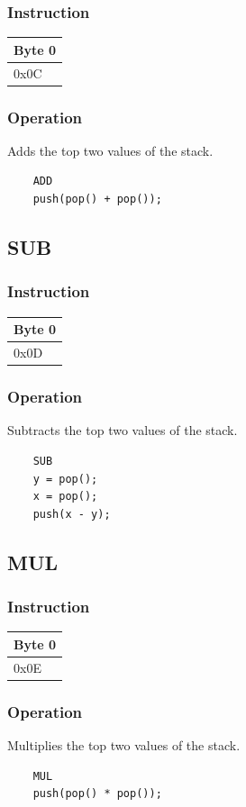 \documentclass[11pt]{report}
\newcommand{\onebyteinstruction}[1]{
\begin{tabular}{|p{3.9em}|}
\hline
\tiny{Byte 0} \\ \hline
#1  \\ \hline
\end{tabular}
}
\begin{document}
\subsubsection{Instruction}
\onebyteinstruction{0x0C}

\subsubsection{Operation}
Adds the top two values of the stack.

	\begin{lstlisting}
	ADD
	push(pop() + pop());
	\end{lstlisting}

\subsection{SUB}
\subsubsection{Instruction}
\onebyteinstruction{0x0D}

\subsubsection{Operation}
Subtracts the top two values of the stack.

	\begin{lstlisting}
	SUB
	y = pop();
	x = pop();
	push(x - y);
	\end{lstlisting}

\subsection{MUL}
\subsubsection{Instruction}
\onebyteinstruction{0x0E}

\subsubsection{Operation}
Multiplies the top two values of the stack.

	\begin{lstlisting}
	MUL
	push(pop() * pop());
	\end{lstlisting}
\end{document}
